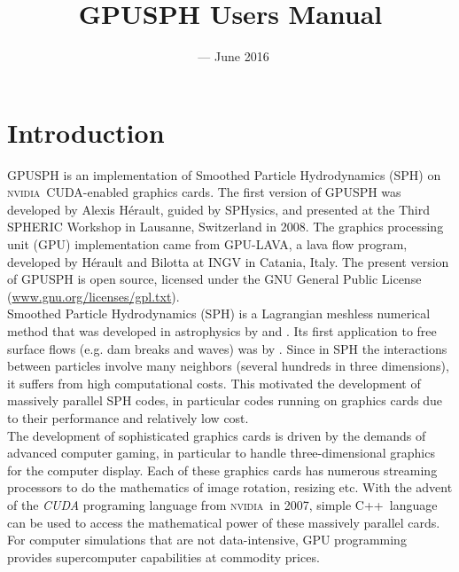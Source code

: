 \documentclass[12pt]{memoir}
\title{GPUSPH Users Manual}
\author{}
\date{\currentver\ --- June 2016}
\newcommand{\nvidia}{\textsc{nvidia}}
\newcommand{\cpp}{{\sffamily C\ttfamily++}}
\begin{document}
\maketitle
\tableofcontents

\chapter{Introduction}

GPUSPH is an implementation of Smoothed Particle Hydrodynamics (SPH) on
\nvidia\ CUDA-enabled graphics cards. The first version of GPUSPH was
developed by Alexis Hérault, guided by SPHysics, and presented at the
Third SPHERIC Workshop in Lausanne, Switzerland in 2008. 
The graphics processing unit (GPU) implementation came from GPU-LAVA, 
a lava flow program, developed by Hérault and Bilotta at INGV in 
Catania, Italy. The present version of GPUSPH is open source, 
licensed under the GNU General Public License
(\url{www.gnu.org/licenses/gpl.txt}). \\

Smoothed Particle Hydrodynamics (SPH) is a Lagrangian meshless numerical
method that was developed in astrophysics by \cite{lucy_numerical_1977} and
\cite{gingold_smoothed_1977}. Its first application to free surface flows (e.g.
dam breaks and waves) was by \cite{monaghan_volcanoes_1994}.
Since in SPH the interactions between particles involve many neighbors
(several hundreds in three dimensions), it suffers from high computational costs.
This motivated the development of massively parallel SPH codes,
in particular codes running on graphics cards due to their performance and relatively
low cost.\\

The development of sophisticated graphics cards is driven by the demands of 
advanced computer gaming, in particular to handle three-dimensional 
graphics for the computer display. Each of these
graphics cards has numerous streaming processors to do the mathematics
of image rotation, resizing etc. With the advent of the {\em CUDA}
programing language from \nvidia\ in 2007, simple \cpp\ language can be used
to access the mathematical power of these massively parallel cards. For
computer simulations that are not data-intensive, GPU programming
provides supercomputer capabilities at commodity prices.\\
\end{document}
